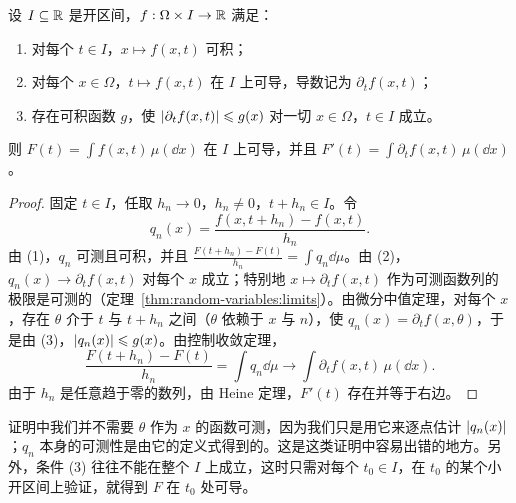 \begin{theorem}[积分号下求导]\label{thm:integration:differentiation}
设 $I\subseteq\mathbb{R}$ 是开区间，$f:\Omega\times I\to\mathbb{R}$ 满足：
\begin{enumerate}
\item 对每个 $t\in I$，$x\mapsto f(x,t)$ 可积；
\item 对每个 $x\in\Omega$，$t\mapsto f(x,t)$ 在 $I$ 上可导，导数记为 $\partial_tf(x,t)$；
\item 存在可积函数 $g$，使 $\lvert \partial_tf(x,t)\rvert\leqslant g(x)$ 对一切 $x\in\Omega$，$t\in I$ 成立。
\end{enumerate}
则 $F(t)=\int f(x,t)\,\mu(\dd x)$ 在 $I$ 上可导，并且 $F'(t)=\int\partial_tf(x,t)\,\mu(\dd x)$。
\end{theorem}
\begin{proof}
固定 $t\in I$，任取 $h_n\to0$，$h_n\neq0$，$t+h_n\in I$。令
\[
q_n(x)=\frac{f(x,t+h_n)-f(x,t)}{h_n}.
\]
由 (1)，$q_n$ 可测且可积，并且 $\frac{F(t+h_n)-F(t)}{h_n}=\int q_n\dd\mu$。由 (2)，$q_n(x)\to\partial_tf(x,t)$ 对每个 $x$ 成立；特别地 $x\mapsto\partial_tf(x,t)$ 作为可测函数列的极限是可测的（定理~\ref{thm:random-variables:limits}）。由微分中值定理，对每个 $x$，存在 $\theta$ 介于 $t$ 与 $t+h_n$ 之间（$\theta$ 依赖于 $x$ 与 $n$），使 $q_n(x)=\partial_tf(x,\theta)$，于是由 (3)，$\lvert q_n(x)\rvert\leqslant g(x)$。由控制收敛定理，
\[
\frac{F(t+h_n)-F(t)}{h_n}=\int q_n\dd\mu\to\int\partial_tf(x,t)\,\mu(\dd x).
\]
由于 $h_n$ 是任意趋于零的数列，由 Heine 定理，$F'(t)$ 存在并等于右边。
\end{proof}

\begin{remark}
证明中我们并不需要 $\theta$ 作为 $x$ 的函数可测，因为我们只是用它来逐点估计 $\lvert q_n(x)\rvert$；$q_n$ 本身的可测性是由它的定义式得到的。这是这类证明中容易出错的地方。另外，条件 (3) 往往不能在整个 $I$ 上成立，这时只需对每个 $t_0\in I$，在 $t_0$ 的某个小开区间上验证，就得到 $F$ 在 $t_0$ 处可导。
\end{remark}

